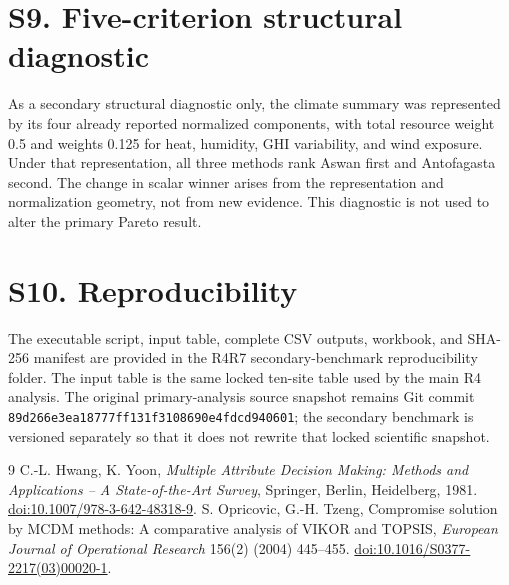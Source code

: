 \documentclass[11pt]{article}
\begin{document}
\section*{S9. Five-criterion structural diagnostic}
As a secondary structural diagnostic only, the climate summary was represented by its four already reported normalized components, with total resource weight 0.5 and weights 0.125 for heat, humidity, GHI variability, and wind exposure. Under that representation, all three methods rank Aswan first and Antofagasta second. The change in scalar winner arises from the representation and normalization geometry, not from new evidence. This diagnostic is not used to alter the primary Pareto result.

\section*{S10. Reproducibility}
The executable script, input table, complete CSV outputs, workbook, and SHA-256 manifest are provided in the R4R7 secondary-benchmark reproducibility folder. The input table is the same locked ten-site table used by the main R4 analysis. The original primary-analysis source snapshot remains Git commit \texttt{89d266e3ea18777ff131f3108690e4fdcd940601}; the secondary benchmark is versioned separately so that it does not rewrite that locked scientific snapshot.

\begin{thebibliography}{9}
 C.-L. Hwang, K. Yoon, \emph{Multiple Attribute Decision Making: Methods and Applications -- A State-of-the-Art Survey}, Springer, Berlin, Heidelberg, 1981. \href{https://doi.org/10.1007/978-3-642-48318-9}{doi:10.1007/978-3-642-48318-9}.
 S. Opricovic, G.-H. Tzeng, Compromise solution by MCDM methods: A comparative analysis of VIKOR and TOPSIS, \emph{European Journal of Operational Research} 156(2) (2004) 445--455. \href{https://doi.org/10.1016/S0377-2217(03)00020-1}{doi:10.1016/S0377-2217(03)00020-1}.
\end{thebibliography}
\end{document}
